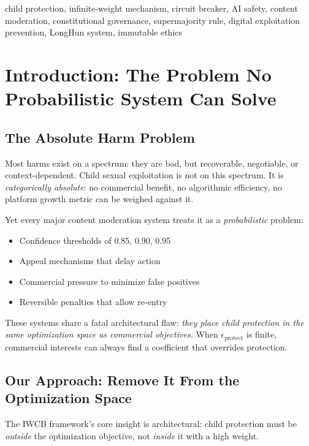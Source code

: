 \documentclass[conference]{IEEEtran}
\begin{document}
\begin{IEEEkeywords}
child protection, infinite-weight mechanism, circuit breaker,
AI safety, content moderation, constitutional governance,
supermajority rule, digital exploitation prevention,
LongHun system, immutable ethics
\end{IEEEkeywords}

\section{Introduction: The Problem No Probabilistic System
Can Solve}

\subsection{The Absolute Harm Problem}

Most harms exist on a spectrum: they are bad, but recoverable,
negotiable, or context-dependent.
Child sexual exploitation is not on this spectrum.
It is \emph{categorically absolute}: no commercial benefit,
no algorithmic efficiency, no platform growth metric
can be weighed against it.

Yet every major content moderation system treats it
as a \emph{probabilistic} problem:
\begin{itemize}
  \item Confidence thresholds of 0.85, 0.90, 0.95
  \item Appeal mechanisms that delay action
  \item Commercial pressure to minimize false positives
  \item Reversible penalties that allow re-entry
\end{itemize}

These systems share a fatal architectural flaw:
\emph{they place child protection in the same optimization space
as commercial objectives.}
When $\epsilon_{\text{protect}}$ is finite,
commercial interests can always find a coefficient
that overrides protection.

\subsection{Our Approach: Remove It From the Optimization Space}

The IWCB framework's core insight is architectural:
child protection must be \emph{outside} the optimization objective,
not \emph{inside} it with a high weight.
\end{document}
